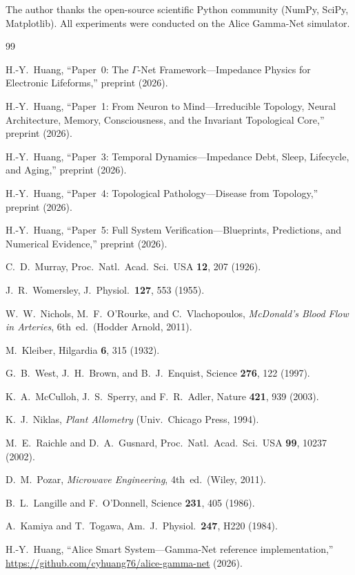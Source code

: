 \documentclass[aps,pre,twocolumn,superscriptaddress,floatfix]{revtex4-2}
\begin{document}
\begin{acknowledgments}
The author thanks the open-source scientific Python
community (NumPy, SciPy, Matplotlib).
All experiments were conducted on the Alice Gamma-Net
simulator.
\end{acknowledgments}


\begin{thebibliography}{99}

H.-Y.~Huang,
``Paper~0: The $\Gamma$-Net Framework---Impedance Physics
for Electronic Lifeforms,''
preprint (2026).

H.-Y.~Huang,
``Paper~1: From Neuron to Mind---Irreducible Topology,
Neural Architecture, Memory, Consciousness,
and the Invariant Topological Core,''
preprint (2026).

H.-Y.~Huang,
``Paper~3: Temporal Dynamics---Impedance Debt, Sleep,
Lifecycle, and Aging,''
preprint (2026).

H.-Y.~Huang,
``Paper~4: Topological Pathology---Disease from Topology,''
preprint (2026).

H.-Y.~Huang,
``Paper~5: Full System Verification---Blueprints,
Predictions, and Numerical Evidence,''
preprint (2026).

C.~D.~Murray,
Proc.\ Natl.\ Acad.\ Sci.\ USA \textbf{12}, 207 (1926).

J.~R.~Womersley,
J.~Physiol.\ \textbf{127}, 553 (1955).

W.~W.~Nichols, M.~F.~O'Rourke, and C.~Vlachopoulos,
\emph{McDonald's Blood Flow in Arteries}, 6th~ed.\
(Hodder Arnold, 2011).

M.~Kleiber,
Hilgardia \textbf{6}, 315 (1932).

G.~B.~West, J.~H.~Brown, and B.~J.~Enquist,
Science \textbf{276}, 122 (1997).

K.~A.~McCulloh, J.~S.~Sperry, and F.~R.~Adler,
Nature \textbf{421}, 939 (2003).

K.~J.~Niklas,
\emph{Plant Allometry} (Univ.\ Chicago Press, 1994).

M.~E.~Raichle and D.~A.~Gusnard,
Proc.\ Natl.\ Acad.\ Sci.\ USA \textbf{99}, 10237 (2002).

D.~M.~Pozar, \emph{Microwave Engineering}, 4th~ed.\
(Wiley, 2011).

B.~L.~Langille and F.~O'Donnell,
Science \textbf{231}, 405 (1986).

A.~Kamiya and T.~Togawa,
Am.\ J.\ Physiol.\ \textbf{247}, H220 (1984).

H.-Y.~Huang,
``Alice Smart System---Gamma-Net reference implementation,''
\url{https://github.com/cyhuang76/alice-gamma-net} (2026).

\end{thebibliography}
\end{document}
